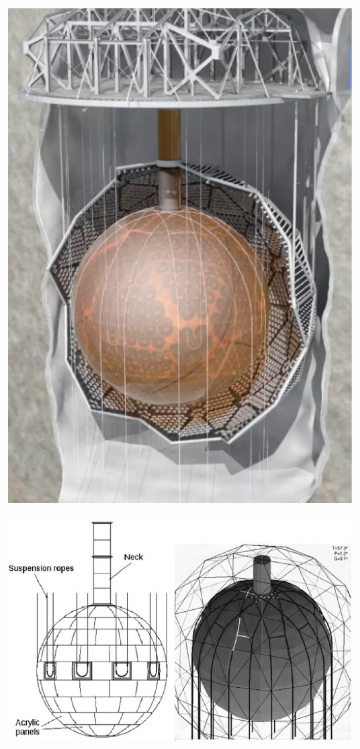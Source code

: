 \begin{figure}[htbp]
\centering
\begin{subfigure}[b]{0.3\textwidth}
\centering
\includegraphics[width=1\textwidth]{cavity}
\caption[SNO+ Diagram] {}
\label{fig:snop_diagram}
\end{subfigure}

\begin{subfigure}[b]{0.6\textwidth}
\centering
\includegraphics[width=1\textwidth]{rope_net}
\caption[SNO+ Ropes]{}
\label{fig:ropes}
\end{subfigure}


\end{figure}
